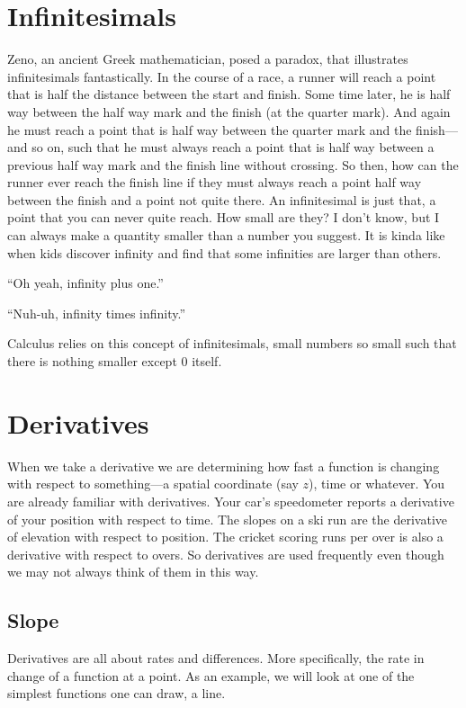 \documentclass[final,a4paper,12pt]{article}
\theoremstyle{definition}
\begin{document}
\section{Infinitesimals}
Zeno, an ancient Greek mathematician, posed a paradox, that illustrates
infinitesimals fantastically.  In the course of a race, a runner will reach a
point that is half the distance between the start and finish.  Some time later,
he is half way between the half way mark and the finish (at the quarter mark).
And again he must reach a point that is half way between the quarter mark and
the finish---and so on, such that he must always reach a point that is half way
between a previous half way mark and the finish line without crossing.  So then,
how can the runner ever reach the finish line if they must always reach a point
half way between the finish and a point not quite there.  An infinitesimal is
just that, a point that you can never quite reach.  How small are they?  I don't
know, but I can always make a quantity smaller than a number you suggest.  It is
kinda like when kids discover infinity and find that some infinities are larger
than others.

``Oh yeah, infinity plus one.''

``Nuh-uh, infinity times infinity.''

Calculus relies on this concept of infinitesimals, small numbers so small such
that there is nothing smaller except 0 itself.


\section{Derivatives}
When we take a derivative we are determining how fast a function is changing
with respect to something---a spatial coordinate (say $z$), time or
whatever.  You are already familiar with derivatives.  Your car's speedometer
reports a derivative of your position with respect to time.  The slopes on a ski
run are the derivative of elevation with respect to position.  The cricket
scoring runs per over is also a derivative with respect to overs.  So
derivatives are used frequently even though we may not always think of them in
this way.

\subsection{Slope}
Derivatives are all about rates and differences.  More specifically, the rate in
change of a function at a point.  As an example, we will look at one of the
simplest functions one can draw, a line.
\end{document}
